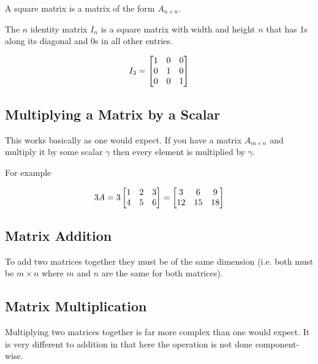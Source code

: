 \documentclass[main.tex]{subfiles}
\begin{document}
                    A square matrix is a matrix of the form $A_{n \times n}$.

                    The $n$ identity matrix $I_n$ is a square matrix with width and height $n$ that has 1s along its diagonal and 0s in all other entries.

                    \begin{equation}
                        I_3 = \begin{bmatrix} 1 & 0 & 0\\0 & 1 & 0\\0 & 0 & 1 \end{bmatrix}
                        \label{eq: Identity Matrix Example}
                    \end{equation}

                \subsection{Multiplying a Matrix by a Scalar}

                    This works basically as one would expect. If you have a matrix $A_{m \times n}$ and multiply it by some scalar $\gamma$ then every element is multiplied by $\gamma$.

                    For example

                    \begin{equation*}
                        3 A = 3 \begin{bmatrix} 1 & 2 & 3\\4 & 5 & 6 \end{bmatrix} = \begin{bmatrix} 3 & 6 & 9\\12 & 15 & 18 \end{bmatrix}
                    \end{equation*}

                \subsection{Matrix Addition}

                    To add two matrices together they must be of the same dimension (i.e. both must be $m \times n$ where $m$ and $n$ are the same for both matrices).

                \subsection{Matrix Multiplication}
                    \label{subsec: Matrix Multiplication}

                    Multiplying two matrices together is far more complex than one would expect. It is very different to addition in that here the operation is not done component-wise.
\end{document}
